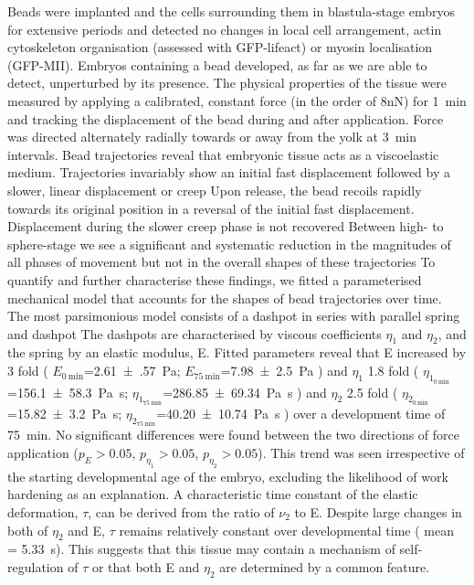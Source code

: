 Beads were implanted and the cells surrounding them in blastula-stage embryos for extensive periods and detected no changes in local cell arrangement, actin cytoskeleton organisation (assessed with GFP-lifeact) or myosin localisation (GFP-MII). %
Embryos containing a bead developed, as far as we are able to detect, unperturbed by its presence.
The physical properties of the tissue were measured by applying a calibrated, constant force (in the order of 8nN) for \SI{1}{\minute} and tracking the displacement of the bead during and after application.
Force was directed alternately radially towards or away from the yolk at \SI{3}{\minute} intervals.
Bead trajectories reveal that embryonic tissue acts as a viscoelastic medium.
Trajectories invariably show an initial fast displacement followed by a slower, linear displacement or creep %
Upon release, the bead recoils rapidly towards its original position in a reversal of the initial fast displacement.
Displacement during the slower creep phase is not recovered %
Between high- to sphere-stage we see a significant and systematic reduction in the magnitudes of all phases of movement but not in the overall shapes of these trajectories  %
To quantify and further characterise these findings, we fitted a parameterised mechanical model that accounts for the shapes of bead trajectories over time.
The most parsimonious model consists of a dashpot in series with parallel spring and dashpot  %
The dashpots are characterised by viscous coefficients $\eta_1$ and $\eta_2$, and the spring by an elastic modulus, E.
Fitted parameters reveal that E increased by 3 fold
(
$E_{\SI{0}{\minute}}$=\SI{2.61(57)}{\pascal};
$E_{\SI{75}{\minute}}$=\SI{7.98(250)}{\pascal}
)
and $\eta_1$ 1.8 fold
(
$\eta_{1_{\SI{0}{\minute}}}$=\SI{156.1(583)}{\pascal\second};
$\eta_{1_{\SI{75}{\minute}}}$=\SI{286.85(6934)}{\pascal\second}
)
and $\eta_2$ 2.5 fold
(
$\eta_{2_{\SI{0}{\minute}}}$=\SI{15.82(320)}{\pascal\second};
$\eta_{2_{\SI{75}{\minute}}}$=\SI{40.20(1074)}{\pascal\second}
)
over a development time of \SI{75}{\minute}.
No significant differences were found between the two directions of force application ($p_E > 0.05$, $p_{\eta_1} > 0.05$, $p_{\eta_2} > 0.05$).
This trend was seen irrespective of the starting developmental age of the embryo, excluding the likelihood of work hardening as an explanation.
A characteristic time constant of the elastic deformation, $\tau$, can be derived from the ratio of $\nu_2$ to E.
Despite large changes in both of $\eta_2$ and E, $\tau$ remains relatively constant over developmental time (%
mean = \SI{5.33}{\second}).
This suggests that this tissue may contain a mechanism of self-regulation of $\tau$ or that both E and $\eta_2$ are determined by a common feature.


